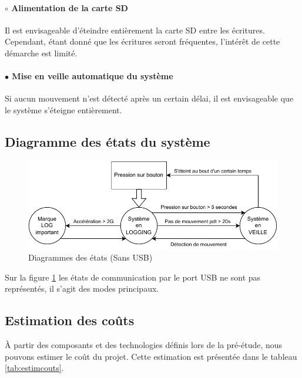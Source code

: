 \paragraph{$\circ$ Alimentation de la carte SD} Il est envisageable d'éteindre entièrement la carte SD entre les écritures. Cependant, étant donné que les écritures seront fréquentes, l'intérêt de cette démarche est limité.

\paragraph{$\bullet$ Mise en veille automatique du système} Si aucun mouvement n'est détecté après un certain délai, il est envisageable que le système s'éteigne entièrement.

\subsection{Diagramme des états du système} 

\begin{figure}[h]
	\centering
	\includegraphics[width=0.8\linewidth]{../figures/pre_etude/Diagramme_Etat_Preetude}
	\caption{Diagrammes des états (Sans USB)}
	\label{fig:diagrammeetatpreetude}
\end{figure}

Sur la figure \ref{fig:diagrammeetatpreetude} les états de communication par le port USB ne sont pas représentés, il s'agit des modes principaux.


\clearpage

\subsection{Estimation des coûts} \label{ssec:Estimation-Couts}

À partir des composants et des technologies définis lors de la pré-étude, nous pouvons estimer le coût du projet. Cette estimation est présentée dans le tableau \ref{tab:estimcouts}.

